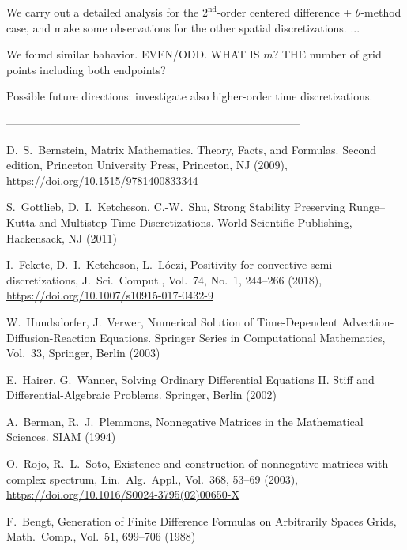\documentclass[a4paper]{article}
\begin{document}
We carry out a detailed analysis for the $2^\text{nd}$-order centered difference + $\theta$-method case, and make some observations for the other spatial discretizations.  ...

We found similar bahavior. EVEN/ODD. WHAT IS $m$? THE number of grid points including both endpoints?

Possible future directions: investigate also higher-order time discretizations.

--------------------------------------------------------------------------------\\


\begin{thebibliography}{99}

D.~S.~Bernstein, Matrix Mathematics. Theory, Facts, and Formulas. Second edition, Princeton University Press, Princeton, NJ (2009), \href{https://doi.org/10.1515/9781400833344}{https://doi.org/10.1515/9781400833344}

{S.~Gottlieb,  D.~I.~Ketcheson,  C.-W.~Shu}, {Strong Stability Preserving {R}unge--{K}utta and Multistep Time Discretizations}. {World Scientific Publishing, Hackensack, NJ} ({2011})

I.~Fekete, D.~I.~Ketcheson, L.~L\'oczi, Positivity for convective semi-discretizations, J.~Sci.~Comput., Vol.~74, No.~1, 244--266 (2018), \href{https://doi.org/10.1007/s10915-017-0432-9}{https://doi.org/10.1007/s10915-017-0432-9}


W.~Hundsdorfer, J.~Verwer, Numerical Solution of Time-Dependent Advection-Diffusion-Reaction
Equations. Springer Series in Computational Mathematics, Vol.~33, Springer, Berlin (2003)    

E.~Hairer, G.~Wanner, Solving Ordinary Differential Equations II. Stiff
and Differential-Algebraic Problems. Springer, Berlin (2002)

 A.~Berman, R.~J.~Plemmons, Nonnegative Matrices in the Mathematical Sciences. SIAM (1994)
 
O.~Rojo, R.~L.~Soto, Existence and construction of nonnegative matrices with complex spectrum, 
Lin.~Alg.~Appl., Vol.~368, 53--69 (2003), \href{https://doi.org/10.1016/S0024-3795(02)00650-X}{https://doi.org/10.1016/S0024-3795(02)00650-X}

F.~Bengt, Generation of Finite Difference Formulas on Arbitrarily Spaces Grids, Math.~Comp., Vol.~51, 699--706 (1988)



\end{thebibliography}
\end{document}
